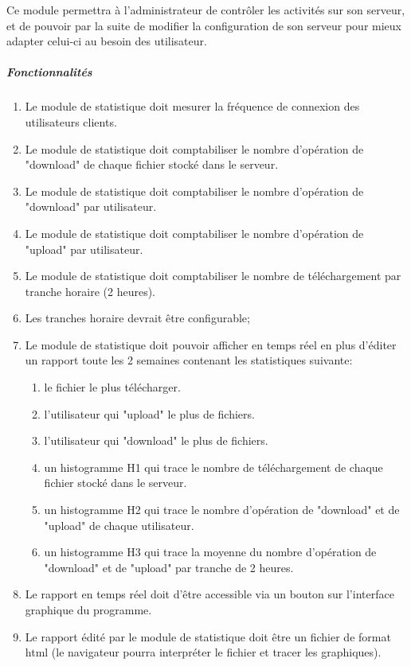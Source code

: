\documentclass[10pt,a4paper]{report}
\begin{document}
	Ce module permettra à l'administrateur de contrôler les activités sur son serveur, et 	de pouvoir par la suite de modifier la configuration de son serveur pour mieux adapter celui-ci au besoin des utilisateur.

	\subparagraph{Fonctionnalités}

		\begin{enumerate}
			\item Le module de statistique doit mesurer la fréquence de connexion des utilisateurs clients.

			\item Le module de statistique doit comptabiliser le nombre d'opération de "download" de chaque fichier stocké dans le serveur.

			\item Le module de statistique doit comptabiliser le nombre d'opération de "download" par utilisateur.

			\item Le module de statistique doit comptabiliser le nombre d'opération de "upload" par utilisateur.

			\item Le module de statistique doit comptabiliser le nombre de téléchargement par tranche horaire (2 heures).

			\item Les tranches horaire devrait être configurable;

			\item Le module de statistique doit pouvoir afficher en temps réel en plus d'éditer un rapport toute les 2 semaines contenant les statistiques suivante:

			\begin{enumerate}[label=\arabic*.]
				\item le fichier le plus télécharger.

				\item l'utilisateur qui "upload" le plus de fichiers.

				\item l'utilisateur qui "download" le plus de fichiers.

				\item un histogramme H1 qui trace le nombre de téléchargement de chaque fichier stocké dans le serveur.

				\item un histogramme H2 qui trace le nombre d'opération de "download" et de "upload" de chaque utilisateur.

				\item un histogramme H3 qui trace la moyenne du nombre d'opération de "download" et de "upload" par tranche de 2 heures.
			\end{enumerate}

			\item Le rapport en temps réel doit d'être accessible via un bouton sur l'interface graphique du programme.

			\item Le rapport édité par le module de statistique doit être un fichier de format html (le navigateur pourra interpréter le fichier et tracer les graphiques).
		\end{enumerate}
	
\end{document}
